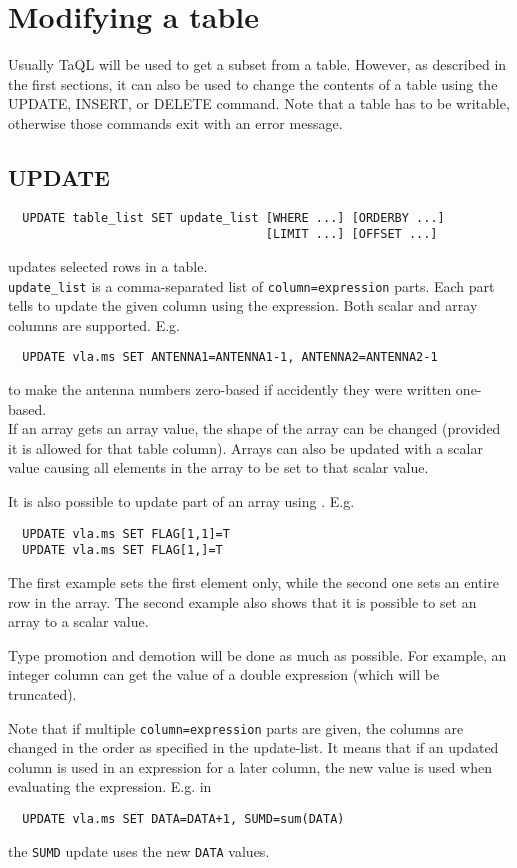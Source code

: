 \section{\label{TAQL:MODIFYING}Modifying a table}
Usually TaQL will be used to get a subset from a table. However, as
described in the first sections, it can also be used to change the
contents of a table using the UPDATE, INSERT, or DELETE command.
Note that a table has to be writable, otherwise those commands
exit with an error message.

\subsection{UPDATE}
\begin{verbatim}
  UPDATE table_list SET update_list [WHERE ...] [ORDERBY ...]
                                    [LIMIT ...] [OFFSET ...]
\end{verbatim}
updates selected rows in a table.
\\\texttt{update\_list}
is a comma-separated list of \texttt{column=expression} parts.
Each part tells to update the given column using the
expression. Both scalar and array columns are supported.
E.g.
\begin{verbatim}
  UPDATE vla.ms SET ANTENNA1=ANTENNA1-1, ANTENNA2=ANTENNA2-1
\end{verbatim}
to make the antenna numbers zero-based if accidently they were
written one-based.
\\If an array gets an array value, the shape of the array can be
changed (provided it is allowed for that table column).
Arrays can also be updated with a scalar value causing all elements
in the array to be set to that scalar value.

It is also possible to update part of an array using
. E.g.
\begin{verbatim}
  UPDATE vla.ms SET FLAG[1,1]=T
  UPDATE vla.ms SET FLAG[1,]=T
\end{verbatim}
The first example sets the first element only, while the second
one sets an entire row in the array. The second example also
shows that it is possible to set an array to a scalar value.

Type promotion and demotion will be done as much as possible.
For example, an integer column can get the value of a double
expression (which will be truncated).

Note that if multiple \texttt{column=expression} parts are given,
the columns are changed in the order as specified in the update-list.
It means that if an updated column is used in an expression for
a later column, the new value is used when evaluating the
expression. E.g. in
\begin{verbatim}
  UPDATE vla.ms SET DATA=DATA+1, SUMD=sum(DATA)
\end{verbatim}
the \texttt{SUMD} update uses the new \texttt{DATA} values.
    


